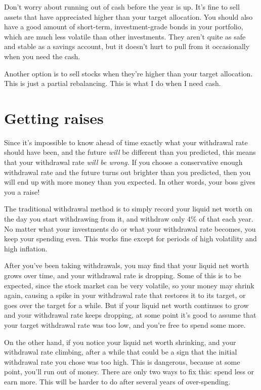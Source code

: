 Don't worry about running out of cash before the year is up. It's fine to sell assets that have appreciated higher than your target allocation. You should also have a good amount of short-term, investment-grade bonds in your portfolio, which are much less volatile than other investments. They aren't quite as safe and stable as a savings account, but it doesn't hurt to pull from it occasionally when you need the cash.

Another option is to sell stocks when they're higher than your target allocation. This is just a partial rebalancing. This is what I do when I need cash.

\section{Getting raises}
Since it's impossible to know ahead of time exactly what your withdrawal rate should have been, and the future \emph{will} be different than you predicted, this means that your withdrawal rate \emph{will be wrong.} If you choose a conservative enough withdrawal rate and the future turns out brighter than you predicted, then you will end up with more money than you expected. In other words, your boss gives you a raise!

The traditional withdrawal method is to simply record your liquid net worth on the day you start withdrawing from it, and withdraw only 4\% of that each year. No matter what your investments do or what your withdrawal rate becomes, you keep your spending even. This works fine except for periods of high volatility and high inflation.

After you've been taking withdrawals, you may find that your liquid net worth grows over time, and your withdrawal rate is dropping. Some of this is to be expected, since the stock market can be very volatile, so your money may shrink again, causing a spike in your withdrawal rate that restores it to its target, or goes over the target for a while. But if your liquid net worth continues to grow and your withdrawal rate keeps dropping, at some point it's good to assume that your target withdrawal rate was too low, and you're free to spend some more.

On the other hand, if you notice your liquid net worth shrinking, and your withdrawal rate climbing, after a while that could be a sign that the initial withdrawal rate you chose was too high. This is dangerous, because at some point, you'll run out of money. There are only two ways to fix this: spend less or earn more. This will be harder to do after several years of over-spending.

